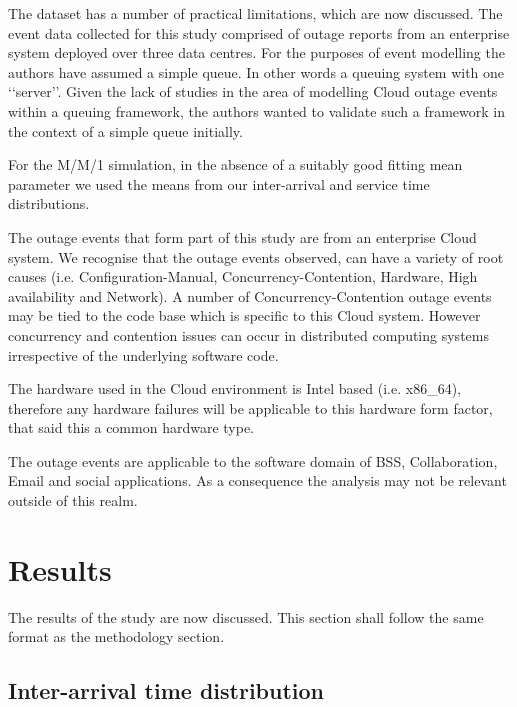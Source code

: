 \documentclass[5p]{elsarticle}
\begin{document}
The dataset has a number of practical limitations, which are now discussed. The event data collected for this study comprised of outage reports from an enterprise system deployed over three data centres. For the purposes of event modelling the authors have assumed a simple queue. In other words a queuing system with one \lq\lq server\rq\rq. Given the lack of studies in the area of modelling Cloud outage events within a queuing framework, the authors wanted to validate such a framework in the context of a simple queue initially. 

For the M/M/1 simulation, in the absence of a suitably good fitting mean parameter we used the means from our inter-arrival and service time distributions.

The outage events that form part of this study are from an enterprise Cloud system. We recognise that the outage events observed, can have a variety of root causes (i.e. Configuration-Manual, Concurrency-Contention, Hardware, High availability and Network). A number of Concurrency-Contention outage events may be tied to the code base which is specific to this Cloud system. However concurrency and contention issues can occur in distributed computing systems irrespective of the underlying software code.

The hardware used in the Cloud environment is Intel based (i.e. x86\_64), therefore any hardware failures will be applicable to this hardware form factor, that said this a common hardware type.

The outage events are applicable to the software domain of BSS, Collaboration, Email and social applications. As a consequence the analysis may not be relevant outside of this realm.

\section{Results}
The results of the study are now discussed. This section shall follow the same format as the methodology section.

\subsection{Inter-arrival time distribution}
\end{document}
